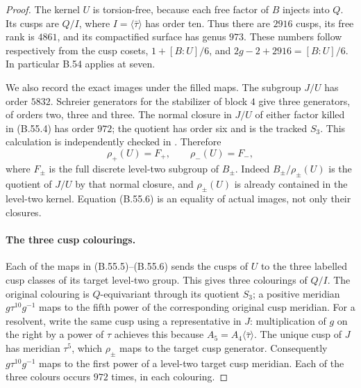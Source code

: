 \begin{proof}
The kernel $U$ is torsion-free, because each free factor
of $B$ injects into $Q$. Its cusps are $Q/I$, where
$I=\langle\bar\tau\rangle$ has order ten. Thus there are
$2916$ cusps, its free rank is $4861$, and its compactified
surface has genus $973$. These numbers follow respectively
from the cusp cosets, $1+[B:U]/6$, and
$2g-2+2916=[B:U]/6$. In particular B.54 applies at seven.

We also record the exact images under the filled maps.
The subgroup $J/U$ has order $5832$. Schreier generators
for the stabilizer of block $4$ give three generators,
of orders two, three and three. The normal closure in
$J/U$ of either factor killed in (B.55.4) has order $972$;
the quotient has order six and is the tracked $S_3$.
This calculation is independently checked in
. Therefore
\[
                  \rho_+(U)=F_+,
                  \qquad\rho_-(U)=F_-,                    \tag{B.55.6}
\]
where $F_\pm$ is the full discrete level-two subgroup of
$B_\pm$. Indeed $B_\pm/\rho_\pm(U)$ is the quotient of
$J/U$ by that normal closure, and $\rho_\pm(U)$ is already
contained in the level-two kernel. Equation (B.55.6) is an
equality of actual images, not only their closures.

\paragraph{The three cusp colourings.}
Each of the maps in (B.55.5)--(B.55.6) sends the cusps of
$U$ to the three labelled cusp classes of its target
level-two group. This gives three colourings of $Q/I$.
The original colouring is $Q$-equivariant through its
quotient $S_3$; a positive meridian $g\tau^{10}g^{-1}$
maps to the fifth power of the corresponding original
cusp meridian. For a resolvent, write the same cusp
using a representative in $J$: multiplication of $g$ on
the right by a power of $\tau$ achieves this because
$A_5=A_4\langle\bar\tau\rangle$.
The unique cusp of $J$ has meridian $\tau^5$, which
$\rho_\pm$ maps to the target cusp generator. Consequently
$g\tau^{10}g^{-1}$ maps to the first power of a level-two
target cusp meridian. Each of the three colours occurs
$972$ times, in each colouring.


\end{proof}

